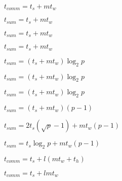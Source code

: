 \documentclass[10pt]{book}
\begin{document}
\begin{mdSnippets}
\begin{mdInlineSnippet}%
$t_{comm} = t_s + mt_w$\end{mdInlineSnippet}%
\begin{mdInlineSnippet}[10819d45a6f11b738122f5fb8de9b0d8]%
$t_{sum} = t_s + mt_w$\end{mdInlineSnippet}%
\begin{mdInlineSnippet}[10819d45a6f11b738122f5fb8de9b0d8]%
$t_{sum} = t_s + mt_w$\end{mdInlineSnippet}%
\begin{mdInlineSnippet}[10819d45a6f11b738122f5fb8de9b0d8]%
$t_{sum} = t_s + mt_w$\end{mdInlineSnippet}%
\begin{mdInlineSnippet}%
$t_{sum} = (t_s + mt_w) \log _2 p$\end{mdInlineSnippet}%
\begin{mdInlineSnippet}%
$t_{sum} = (t_s + mt_w) \log _2 p$\end{mdInlineSnippet}%
\begin{mdInlineSnippet}%
$t_{sum} = (t_s + mt_w) \log _2 p$\end{mdInlineSnippet}%
\begin{mdInlineSnippet}[76ecbdcc60db753d50e0f54442684a1f]%
$t_{sum} = (t_s + mt_w)(p - 1)$\end{mdInlineSnippet}%
\begin{mdInlineSnippet}[9f1e04740609c172e554c5544a2e4175]%
$t_{sum} = 2t_s(\sqrt {p} - 1) + mt_w(p  - 1)$\end{mdInlineSnippet}%
\begin{mdInlineSnippet}[d0200a7499f424eef524040c317cc427]%
$t_{sum} = t_s{\log _2 p} + mt_w(p - 1)$\end{mdInlineSnippet}%
\begin{mdInlineSnippet}[14f13d69ba04cfd2d3520f963e2d0632]%
$t_{comm} = t_s +l(mt_w+t_h)$\end{mdInlineSnippet}%
\begin{mdInlineSnippet}%
$t_{comm} = t_s + lmt_w$\end{mdInlineSnippet}%

\end{mdSnippets}
\end{document}

